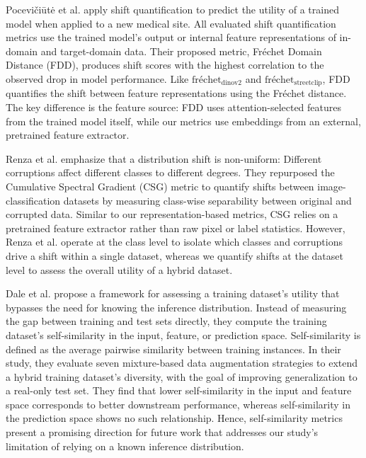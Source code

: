 \documentclass[conference]{IEEEtran}
\begin{document}
Pocevi\v{c}i\={u}t\.{e} et al. \cite{shiftForModelUtility} apply shift quantification to predict the utility of a trained model when applied to a new medical site. All evaluated shift quantification metrics use the trained model's output or internal feature representations of in-domain and target-domain data. Their proposed metric, Fréchet Domain Distance (FDD), produces shift scores with the highest correlation to the observed drop in model performance. Like $\text{fréchet}_{\text{dinov2}}$ and $\text{fréchet}_{\text{streetclip}}$, FDD quantifies the shift between feature representations using the Fréchet distance. The key difference is the feature source: FDD uses attention-selected features from the trained model itself, while our metrics use embeddings from an external, pretrained feature extractor.

Renza et al. \cite{renza2024} emphasize that a distribution shift is non-uniform: Different corruptions affect different classes to different degrees. They repurposed the Cumulative Spectral Gradient (CSG) metric to quantify shifts between image-classification datasets by measuring class-wise separability between original and corrupted data. Similar to our representation-based metrics, CSG relies on a pretrained feature extractor rather than raw pixel or label statistics. However, Renza et al. operate at the class level to isolate which classes and corruptions drive a shift within a single dataset, whereas we quantify shifts at the dataset level to assess the overall utility of a hybrid dataset.

Dale et al. \cite{dale2024} propose a framework for assessing a training dataset’s utility that bypasses the need for knowing the inference distribution. Instead of measuring the gap between training and test sets directly, they compute the training dataset’s self-similarity in the input, feature, or prediction space. Self-similarity is defined as the average pairwise similarity between training instances. In their study, they evaluate seven mixture-based data augmentation strategies to extend a hybrid training dataset's diversity, with the goal of improving generalization to a real-only test set. They find that lower self-similarity in the input and feature space corresponds to better downstream performance, whereas self-similarity in the prediction space shows no such relationship. Hence, self-similarity metrics present a promising direction for future work that addresses our study’s limitation of relying on a known inference distribution.
\end{document}
